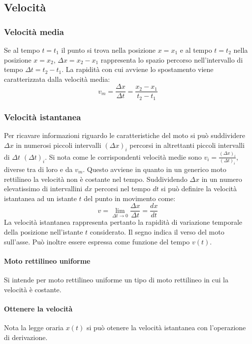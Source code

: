 	\subsection{Velocit\`a}

		\subsubsection{Velocit\`a media}
		Se al tempo $t=t_1$ il punto si trova nella posizione $x=x_1$ e al tempo $t=t_2$ nella posizione $x=x_2$, $\Delta x = x_2 - x_1$ rappresenta lo spazio percorso nell'intervallo di tempo $\Delta t = t_2 - t_1$.
		La rapidit\`a con cui avviene lo spostamento viene caratterizzata dalla velocit\`a media:
		$$v_m = \dfrac{\Delta x}{\Delta t} = \dfrac{x_2 - x_1}{t_2 - t_1}$$

		\subsubsection{Velocit\`a istantanea}
		Per ricavare informazioni riguardo le caratteristiche del moto si pu\`o suddividere $\Delta x$ in numerosi piccoli intervalli $(\Delta x)_i$ percorsi in altrettanti piccoli intervalli di $\Delta t$ $(\Delta t)_i$.
		Si nota come le corrispondenti velocit\`a medie sono $v_i = \frac{(\Delta x)_i}{(\Delta t)_i}$, diverse tra di loro e da $v_m$.
		Questo avviene in quanto in un generico moto rettilineo la velocit\`a non \`e costante nel tempo.
		Suddividendo $\Delta x$ in un numero elevatissimo di intervallini $dx$ percorsi nel tempo $dt$ si pu\`o definire la velocit\`a istantanea ad un istante $t$ del punto in movimento come:
		$$v = \lim\limits_{\Delta t \rightarrow 0} \dfrac{\Delta x}{\Delta t} = \dfrac{dx}{dt}$$
		La velocit\`a istantanea rappresenta pertanto la rapidit\`a di variazione temporale della posizione nell'istante $t$ considerato.
		Il segno indica il verso del moto sull'asse.
		Pu\`o inoltre essere espressa come funzione del tempo $v(t)$.

			\paragraph{Moto rettilineo uniforme}
			Si intende per moto rettilineo uniforme un tipo di moto rettilineo in cui la velocit\`a \`e costante.

			\paragraph{Ottenere la velocit\`a}
			Nota la legge oraria $x(t)$ si pu\`o otenere la velocit\`a istantanea con l'operazione di derivazione.

